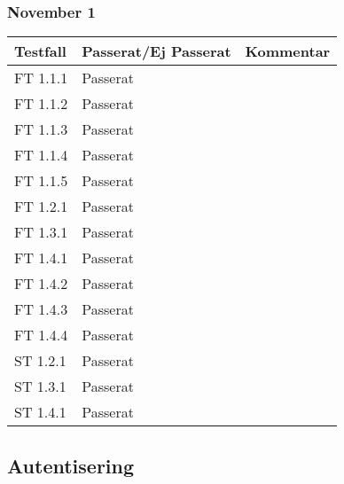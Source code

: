 \documentclass[a4paper]{article}
\begin{document}
\subsubsection{November 1}
\begin{tabular}{| l | l | p{9cm} |}
\hline
Testfall & Passerat/Ej Passerat & Kommentar\\
\hline
FT 1.1.1 & Passerat & \\
\hline
FT 1.1.2 & Passerat & \\
\hline
FT 1.1.3 & Passerat & \\
\hline
FT 1.1.4 & Passerat & \\
\hline
FT 1.1.5 & Passerat & \\
\hline
FT 1.2.1 & Passerat & \\
\hline
FT 1.3.1 & Passerat & \\
\hline
FT 1.4.1 & Passerat & \\
\hline
FT 1.4.2 & Passerat & \\
\hline
FT 1.4.3 & Passerat & \\
\hline
FT 1.4.4 & Passerat & \\
\hline
ST 1.2.1 & Passerat & \\
\hline
ST 1.3.1 & Passerat & \\
\hline
ST 1.4.1 & Passerat & \\
\hline
\end{tabular}







\subsection{Autentisering}
\end{document}
